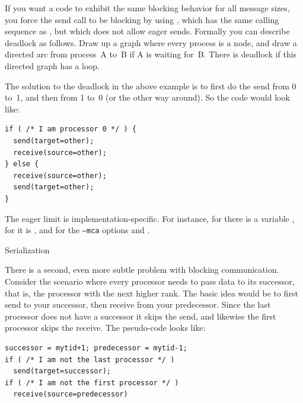 If you want a code to exhibit the same blocking behavior for  all message sizes,
you force the send call to be blocking by using
, which has the same calling sequence as ,
but which does not allow eager sends.
%
%
Formally you can describe deadlock as follows. Draw up a graph where
every process is a node, and draw a directed arc from process~A to~B if
A is waiting for~B. There is deadlock if this directed graph has a
loop.

The solution to the deadlock in the above example is to first do the
send from 0 to~1, and then from 1 to~0 (or the other way around). So
the code would look like:
\begin{lstlisting}
if ( /* I am processor 0 */ ) {
  send(target=other);
  receive(source=other);
} else {
  receive(source=other);
  send(target=other);
}
\end{lstlisting}

The eager limit is implementation-specific. For instance, for
 there is a variable
, for  it is
, and for  the
\texttt{--mca} options  and
.


 {Serialization}
\label{sec:serialization}

There is a second, even more subtle problem with blocking
communication. Consider the scenario where every processor needs to
pass data to its successor, that is, the processor with the next
higher rank. The basic idea would be to first send to your successor,
then receive from your predecessor. Since the last processor does not
have a successor it skips the send, and likewise the first processor
skips the receive. The pseudo-code looks like:
\begin{lstlisting}
successor = mytid+1; predecessor = mytid-1;
if ( /* I am not the last processor */ )
  send(target=successor);
if ( /* I am not the first processor */ )
  receive(source=predecessor)
\end{lstlisting}

